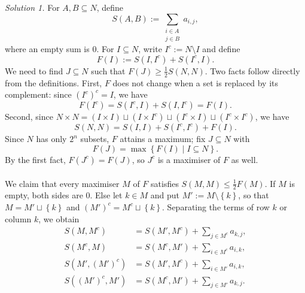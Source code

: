 \begin{solution}
    \textit{Solution 1.}
    For \( A, B \subseteq N \), define
    \[
        S\left(A, B\right) := \sum_{\substack{i \in A \\ j \in B}} a_{i,j},
    \]
    where an empty sum is \( 0 \). For \( I \subseteq N \), write \( I^{c} := N \setminus I \) and define
    \[
        F\left(I\right) := S\left(I, I^{c}\right) + S\left(I^{c}, I\right).
    \]
    We need to find \( J \subseteq N \) such that \( F\left(J\right) \geq \frac{1}{2} S\left(N, N\right) \). Two facts follow directly from the definitions. First, \( F \) does not change when a set is replaced by its complement: since \( \left(I^{c}\right)^{c} = I \), we have
    \[
        F\left(I^{c}\right) = S\left(I^{c}, I\right) + S\left(I, I^{c}\right) = F\left(I\right).
    \]
    Second, since \( N \times N = \left(I \times I\right) \sqcup \left(I \times I^{c}\right) \sqcup \left(I^{c} \times I\right) \sqcup \left(I^{c} \times I^{c}\right) \), we have
    \[
        S\left(N, N\right) = S\left(I, I\right) + S\left(I^{c}, I^{c}\right) + F\left(I\right).
    \]
    Since \( N \) has only \( 2^{n} \) subsets, \( F \) attains a maximum; fix \( J \subseteq N \) with
    \[
        F\left(J\right) = \max\left\{ F\left(I\right) \mid I \subseteq N \right\}.
    \]
    By the first fact, \( F\left(J^{c}\right) = F\left(J\right) \), so \( J^{c} \) is a maximiser of \( F \) as well.
    \\\\
    We claim that every maximiser \( M \) of \( F \) satisfies \( S\left(M, M\right) \leq \frac{1}{2} F\left(M\right) \). If \( M \) is empty, both sides are \( 0 \). Else let \( k \in M \) and put \( M' := M \setminus \left\{k\right\} \), so that \( M = M' \sqcup \left\{k\right\} \) and \( \left(M'\right)^{c} = M^{c} \sqcup \left\{k\right\} \). Separating the terms of row \( k \) or column \( k \), we obtain
    \[
        \begin{aligned}
            S\left(M, M^{c}\right) &= S\left(M', M^{c}\right) + \sum_{j \in M^{c}} a_{k,j}, \\
            S\left(M^{c}, M\right) &= S\left(M^{c}, M'\right) + \sum_{i \in M^{c}} a_{i,k}, \\
            S\left(M', \left(M'\right)^{c}\right) &= S\left(M', M^{c}\right) + \sum_{i \in M'} a_{i,k}, \\
            S\left(\left(M'\right)^{c}, M'\right) &= S\left(M^{c}, M'\right) + \sum_{j \in M'} a_{k,j}.
        \end{aligned}
\]
\end{solution}
